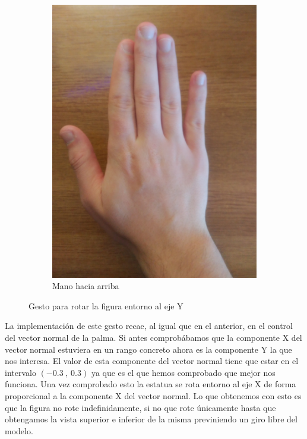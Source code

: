 \documentclass[a4paper,11pt]{article}
\begin{document}
\begin{figure}[!h]
\begin{subfigure}{0.33\textwidth}
		\includegraphics[scale=0.044]{./Imagenes/vista_desde_abajo.jpg}
		\caption{Mano hacia arriba}
	\end{subfigure}
	\caption{Gesto para rotar la figura entorno al eje Y}
	\label{gesto3}
\end{figure}

La implementación de este gesto recae, al igual que en el anterior, en el control del vector normal de la palma. Si antes comprobábamos que la componente X del vector normal estuviera en un rango concreto ahora es la componente Y la que nos interesa. El valor de esta componente del vector normal tiene que estar en el intervalo $(-0.3 \ , \ 0.3)$ ya que es el que hemos comprobado que mejor nos funciona. Una vez comprobado esto la estatua se rota entorno al eje X de forma proporcional a la componente X del vector normal. Lo que obtenemos con esto es que la figura no rote indefinidamente, si no que rote únicamente hasta que obtengamos la vista superior e inferior de la misma previniendo un giro libre del modelo. 
\end{document}
